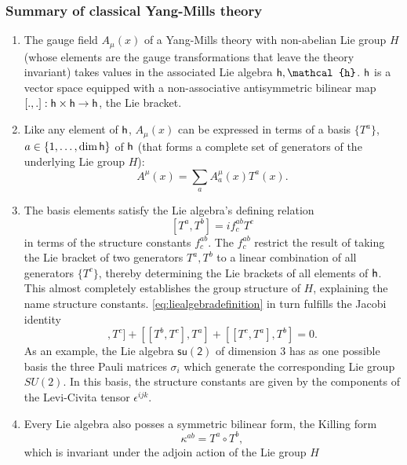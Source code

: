\subsubsection{Summary of classical Yang-Mills theory}
\begin{enumerate}
	\item The gauge field $A_\mu(x)$ of a Yang-Mills theory with non-abelian Lie group $H$ (whose elements are the gauge transformations that leave the theory invariant) takes values in the associated Lie algebra $\mh,\mathcal{h}$. $\mathsf{h}$ is a vector space equipped with a non-associative antisymmetric bilinear map $[.,.]: \mathsf{h}\times \mathsf{h} \rightarrow \mathsf{h}$, the Lie bracket.
	\item Like any element of $\mathsf{h}$, $A_\mu(x)$ can be expressed in terms of a basis $\{T^a\}$, $a\in \{1,\dots,\dim \mathsf{h}\}$ of $\mathsf{h}$ (that forms a complete set of generators of the underlying Lie group $H$):
	\begin{equation}
		A^\mu (x) = \sum_a A^\mu_a(x) T^a(x).
	\end{equation}
	\item The basis elements satisfy the Lie algebra's defining relation
	\begin{equation}
		\label{eq:liealgebradefinition}
		[T^a,T^b] = i f^{ab}_c T^c
	\end{equation}
	in terms of the structure constants $f^{ab}_c$. The $f^{ab}_c$ restrict the result of taking the Lie bracket of two generators $T^a,T^b$ to a linear combination of all generators $\{T^c\}$, thereby determining the Lie brackets of all elements of $\mathsf{h}$. This almost completely establishes the group structure of $H$, explaining the name structure constants. \ref{eq:liealgebradefinition} in turn fulfills the Jacobi identity
	\begin{equation}
		[[T^a,T^b], T^c ] + [[T^b,T^c], T^a]+ [[T^c,T^a], T^b] = 0.
	\end{equation}
	As an example, the Lie algebra $\mathsf{su(2)}$ of dimension $3$ has as one possible basis the three Pauli matrices $\sigma_i$ which generate the corresponding Lie group $SU(2)$. In this basis, the structure constants are given by the components of the Levi-Civita tensor $\epsilon^{ijk}$.
\item Every Lie algebra also posses a symmetric bilinear form, the Killing form
\begin{equation}
\kappa^{ab} = T^a \circ T^b,
\end{equation}
which is invariant under the adjoin action of the Lie group $H$
\begin{equation}

\end{equation}
\end{enumerate}
